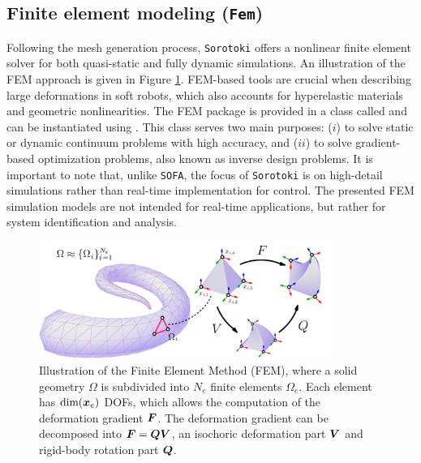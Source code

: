 \subsection{Finite element modeling (\texttt{Fem})}
\label{sec:C5:fem}
Following the mesh generation process, \texttt{Sorotoki} offers a nonlinear finite element solver for both quasi-static and fully dynamic simulations. An illustration of the FEM approach is given in Figure \ref{fig:C5:illustration_FEM}. FEM-based tools are crucial when describing large deformations in soft robots, which also accounts for hyperelastic materials and geometric nonlinearities. The FEM package is provided in a class called  and can be instantiated using . This class serves two main purposes: ($i$) to solve static or dynamic continuum problems with high accuracy, and ($ii$) to solve gradient-based optimization problems, also known as inverse design problems. It is important to note that, unlike \texttt{SOFA}, the focus of \texttt{Sorotoki} is on high-detail simulations rather than real-time implementation for control. The presented FEM simulation models are not intended for real-time applications, but rather for system identification and analysis.

\begin{figure}
\centering
\includegraphics[width=0.85\textwidth]{./pdf/FemExample.pdf}
\caption{\small Illustration of the Finite Element Method (FEM), where a solid geometry $\Omega$ is subdivided into $N_e$ finite elements $\Omega_e$. Each element has $\text{dim}({\boldsymbol{x}}_e)$ DOFs, which allows the computation of the deformation gradient ${\boldsymbol{F}}$. The deformation gradient can be decomposed into ${\boldsymbol{F}} = {\boldsymbol{Q}}{\boldsymbol{V}}$, an isochoric deformation part ${\boldsymbol{V}}$ and rigid-body rotation part ${\boldsymbol{Q}}$. }    
\label{fig:C5:illustration_FEM}
\end{figure}

